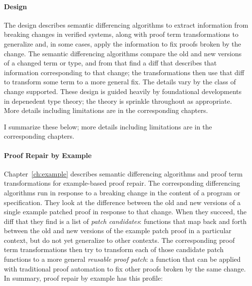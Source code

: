 \paragraph{Design}
The design describes semantic differencing algorithms to extract information from breaking changes in verified systems,
along with proof term transformations to generalize and, in some cases, apply the information to fix proofs broken by the change. %
The semantic differencing algorithms compare the old and new versions of a changed term or type,
and from that find a diff that describes that information corresponding to that change;
the transformations then use that diff to transform some term to a more general fix.
The details vary by the class of change supported.
These design is guided heavily by foundational developments in depenedent type theory;
the theory is sprinkle throughout as appropriate. %
More details including limitations are in the corresponding chapters. %

\iffalse
I summarize these below; more details including limitations are in the corresponding chapters.

\paragraph{Proof Repair by Example} %
Chapter~\ref{ch:example} describes semantic differencing algorithms and proof term transformations for example-based proof repair.  %
The corresponding differencing algorithms run in response to a breaking change in the content of a program or specification. %
They look at the difference between the old and new versions of a single example patched proof in response to that change.
When they succeed, the diff that they find is a list of \textit{patch candidates}: functions that map back and forth between the old and new versions
of the example patch proof in a particular context, but do not yet generalize to other contexts.
The corresponding proof term transformations then try to transform each of those candidate patch functions to a more general \textit{reusable proof patch}:
a function that can be applied with traditional proof automation to fix other proofs broken by the same change.
In summary, proof repair by example has this profile:

